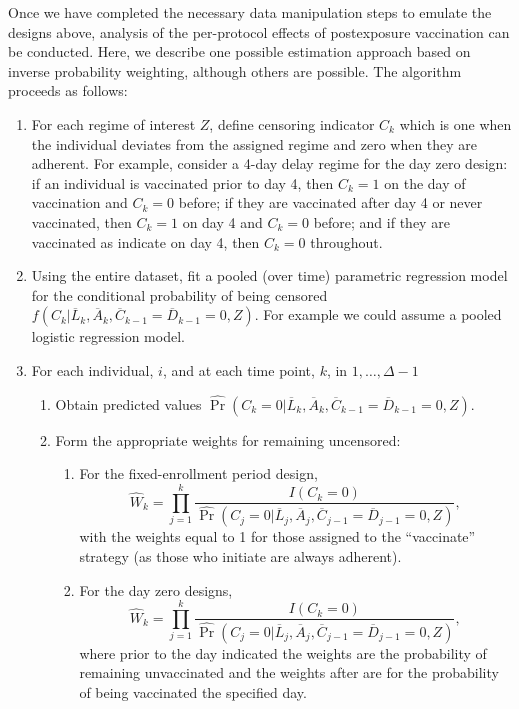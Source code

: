 \begin{appendices}
\begin{refsection}
    Once we have completed the necessary data manipulation steps to emulate the designs above, analysis of the per-protocol effects of postexposure vaccination can be conducted. Here, we describe one possible estimation approach based on inverse probability weighting, although others are possible. The algorithm proceeds as follows:
    \begin{enumerate}
        \item For each regime of interest $Z$, define censoring indicator $C_k$ which is one when the individual deviates from the assigned regime and zero when they are adherent. For example, consider a 4-day delay regime for the day zero design: if an individual is vaccinated prior to day 4, then $C_k = 1$ on the day of vaccination and $C_k = 0$ before; if they are vaccinated after day 4 or never vaccinated, then $C_k = 1$ on day 4 and $C_k = 0$ before; and if they are vaccinated as indicate on day 4, then $C_k = 0$ throughout.
        \item Using the entire dataset, fit a pooled (over time) parametric regression model for the conditional probability of being censored $f(C_k |\overline{L}_k, \overline{A}_k, \overline{C}_{k-1} = \overline{D}_{k-1} = 0, Z)$. For example we could assume a pooled logistic regression model.
        \item For each individual, $i$, and at each time point, $k$, in $1, \ldots, \Delta - 1$
        \begin{enumerate}
            \item Obtain predicted values $\widehat{\Pr}(C_k  = 0|\overline{L}_k, \overline{A}_k, \overline{C}_{k-1} = \overline{D}_{k-1} = 0, Z)$.
            \item Form the appropriate weights for remaining uncensored:
            \begin{enumerate}
                \item For the fixed-enrollment period design,
                $$\widehat{W}_k = \prod_{j = 1}^k \frac{I(C_k = 0)}{\widehat{\Pr}(C_j  = 0|\overline{L}_j, \overline{A}_j, \overline{C}_{j-1} = \overline{D}_{j-1} = 0, Z)},$$
                with the weights equal to 1 for those assigned to the ``vaccinate'' strategy (as those who initiate are always adherent).
                \item For the day zero designs, 
                $$\widehat{W}_k = \prod_{j = 1}^k \frac{I(C_k = 0)}{\widehat{\Pr}(C_j  = 0|\overline{L}_j, \overline{A}_j, \overline{C}_{j-1} = \overline{D}_{j-1} = 0, Z)},$$
                where prior to the day indicated the weights are the probability of remaining unvaccinated and the weights after are for the probability of being vaccinated the specified day.

\end{enumerate}
\end{enumerate}
\end{enumerate}
\end{refsection}
\end{appendices}
